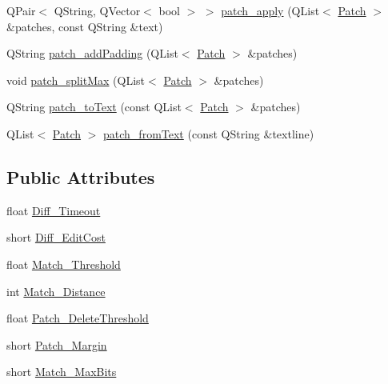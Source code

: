 \begin{DoxyCompactItemize}
\item 
QPair$<$ QString, QVector$<$ bool $>$ $>$ \hyperlink{classdiff__match__patch_acbdd755dfb40abc85760b4f8fbcdc98f}{patch\_\-apply} (QList$<$ \hyperlink{class_patch}{Patch} $>$ \&patches, const QString \&text)
\item 
QString \hyperlink{classdiff__match__patch_a03d8b23bf20cbfc3e454aad38ff366d8}{patch\_\-addPadding} (QList$<$ \hyperlink{class_patch}{Patch} $>$ \&patches)
\item 
void \hyperlink{classdiff__match__patch_a8b026488adde70dcc268fc50d170f4e3}{patch\_\-splitMax} (QList$<$ \hyperlink{class_patch}{Patch} $>$ \&patches)
\item 
QString \hyperlink{classdiff__match__patch_ab23a8022e207c5aa2fd2ee7dad604341}{patch\_\-toText} (const QList$<$ \hyperlink{class_patch}{Patch} $>$ \&patches)
\item 
QList$<$ \hyperlink{class_patch}{Patch} $>$ \hyperlink{classdiff__match__patch_a2d3d6460ce369b1f506a2c5d6b3fdee9}{patch\_\-fromText} (const QString \&textline)
\end{DoxyCompactItemize}
\subsection*{Public Attributes}
\begin{DoxyCompactItemize}
\item 
float \hyperlink{classdiff__match__patch_aaa544a91d8555a780ab261fc1c15b3f9}{Diff\_\-Timeout}
\item 
short \hyperlink{classdiff__match__patch_a3a7134ca63b7e4cb44a2432ef4c34121}{Diff\_\-EditCost}
\item 
float \hyperlink{classdiff__match__patch_a4e7c966c7c2a930a578cf7ac8edc0e86}{Match\_\-Threshold}
\item 
int \hyperlink{classdiff__match__patch_a57c49d8f3692157431ecd74fe6cd3f8f}{Match\_\-Distance}
\item 
float \hyperlink{classdiff__match__patch_a45ecc3f1f3d865c8b1d1b2eb4f40ab33}{Patch\_\-DeleteThreshold}
\item 
short \hyperlink{classdiff__match__patch_a798d3ee5eb9bf60ed679f50fa9a42d9b}{Patch\_\-Margin}
\item 
short \hyperlink{classdiff__match__patch_aa99b26cfb171f9ca3d558db26c76346c}{Match\_\-MaxBits}
\end{DoxyCompactItemize}
